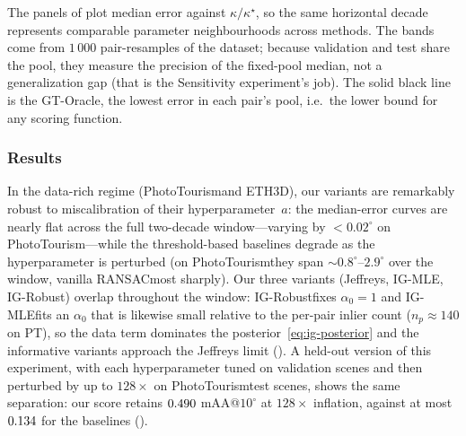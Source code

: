 \documentclass{article}
\newcommand{\mname}[1]{\texorpdfstring{#1\xspace}{#1}}
\newcommand{\ransac}{\mname{RANSAC}}
\newcommand{\igmle}{\mname{IG-MLE}}
\newcommand{\igrobust}{\mname{IG-Robust}}
\newcommand{\phototourism}{\mname{PhotoTourism}}
\newcommand{\ethd}{\mname{ETH3D}}
\begin{document}
The panels of  plot median error against
$\kappa/\kappa^\star$, so the same horizontal decade represents
comparable parameter neighbourhoods across methods.  The bands
come from $1\,000$ pair-resamples of the dataset; because
validation and test share the pool, they measure the precision
of the fixed-pool median, not a generalization gap (that is the
Sensitivity experiment's job).  The solid black line is the
GT-Oracle, the lowest error in each pair's pool, i.e.\ the lower
bound for any scoring function.

\subsubsection{Results}
In the data-rich regime (\phototourism and \ethd), our variants
are remarkably robust to miscalibration of their
hyperparameter~$a$: the median-error curves are nearly flat
across the full two-decade window---varying by ${<}0.02^\circ$ on
\phototourism---while the threshold-based baselines degrade as
the hyperparameter is perturbed (on \phototourism they span
${\sim}0.8^\circ$--$2.9^\circ$ over the window, vanilla \ransac most
sharply).  Our three variants (Jeffreys, \igmle, \igrobust)
overlap throughout the window: \igrobust fixes $\alpha_0 = 1$ and
\igmle fits an $\alpha_0$ that is likewise small relative to the
per-pair inlier count ($n_p \approx 140$ on PT), so the data term
dominates the posterior~\eqref{eq:ig-posterior} and the
informative variants approach the Jeffreys limit
().  A held-out version of this experiment, with
each hyperparameter tuned on validation scenes and then perturbed by up
to $128\times$ on \phototourism test scenes, shows the same separation: %
our score retains $0.490$ mAA@$10^\circ$ at $128\times$ %
inflation, against at most $0.134$ for the baselines
().
\end{document}
